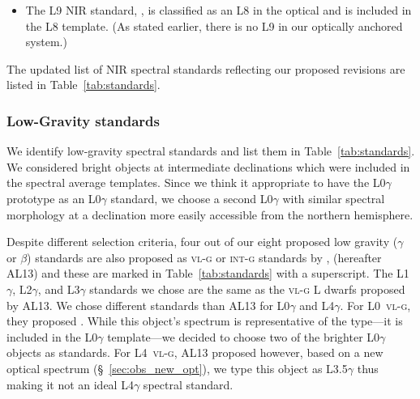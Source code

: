 \documentclass[12pt,preprint]{aastex}
\begin{document}
\begin{itemize}
	\item The L9 NIR standard, , is classified as an L8 in the optical and is included in the L8 template. (As stated earlier, there is no L9 in our optically anchored system.)
	
\end{itemize}

The updated list of NIR spectral standards reflecting our proposed revisions are listed in Table~\ref{tab:standards}.

\subsubsection{Low-Gravity standards}

We identify low-gravity spectral standards and list them in Table~\ref{tab:standards}.
We considered bright objects at intermediate declinations which were included in the spectral average templates.
Since we think it appropriate to have the L0$\gamma$ prototype  as an L0$\gamma$ standard, we choose a second L0$\gamma$ with similar spectral morphology at a declination more easily accessible from the northern hemisphere. 

Despite different selection criteria, four out of our eight proposed low gravity ($\gamma$ or $\beta$) standards are also proposed as \textsc{vl-g} or \textsc{int-g} standards by \citet{Allers:2013hk}, (hereafter AL13) and these are marked in Table~\ref{tab:standards} with a superscript.
The L1$\gamma$, L2$\gamma$, and L3$\gamma$ standards we chose are the same as the \textsc{vl-g} L dwarfs proposed by AL13. 
We chose different standards than AL13 for L0$\gamma$ and L4$\gamma$.
For L0~\textsc{vl-g}, they proposed . While this object's spectrum is representative of the type---it is included in the L0$\gamma$ template---we decided to choose two of the brighter L0$\gamma$ objects as standards.
For L4~\textsc{vl-g}, AL13 proposed  however, based on a new optical spectrum (\S~\ref{sec:obs_new_opt}), we type this object as L3.5$\gamma$ thus making it not an ideal L4$\gamma$ spectral standard. 
\end{document}
